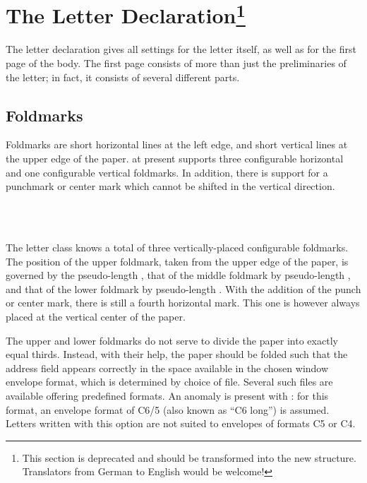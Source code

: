 \section{The Letter Declaration\protect\footnote{This section is
  deprecated and should be transformed into the new structure. Translators
  from German to English would be welcome!}}
\label{sec:scrlttr2.startLetter}

The letter declaration gives all settings for the letter itself, as
well as for the first page of the body. The first page consists of
more than just the preliminaries of the letter; in fact, it consists
of several different parts.


\subsection{Foldmarks}
\label{sec:scrlttr2.foldmarks}
%

Foldmarks are short horizontal lines at the left edge,
and short vertical lines at the upper edge of the paper. \KOMAScript{}
at present supports three configurable horizontal and one configurable
vertical foldmarks. In addition, there is support for a punchmark or
center mark which cannot be shifted in the vertical direction.

\begin{Declaration}
  \\
  \\
\end{Declaration}
%
%
%
The letter class  knows a total of three
vertically-placed configurable foldmarks. The position of the upper
foldmark, taken from the upper edge of the paper, is governed by the
pseudo-length , that of the middle foldmark by
pseudo-length
, and that
of the lower foldmark by pseudo-length . With
the addition of the punch or 
center%
mark, there is still a fourth horizontal mark. This one is however
always placed at the vertical center of the paper.

The upper and lower foldmarks do not serve to divide the paper into
exactly equal thirds. Instead, with their help, the paper should be
folded such that the address field appears correctly in the space
available in the chosen window envelope format, which is determined by
choice of  file. Several such files are available offering
predefined formats. An anomaly is present with : for
this format, an envelope format of C6/5 (also known as ``C6 long'') is
assumed. Letters written with this option are not suited to envelopes
of formats C5 or C4.


